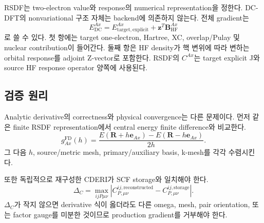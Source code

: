 RSDF는 two-electron value와 response의 numerical representation을 정한다. DC-DFT의
nonvariational 구조 자체는 backend에 의존하지 않는다. 전체 gradient는
\begin{equation}
 E_{\mathrm{DC}}^{Ax}
 =E_{\mathrm{target,explicit}}^{Ax}
 +\mathbf z^T\mathbf B_{\mathrm{HF}}^{Ax}
 \label{eq:dc-rsdf-total}
\end{equation}
로 쓸 수 있다. 첫 항에는 target one-electron, Hartree, XC, overlap/Pulay 및 nuclear
contribution이 들어간다. 둘째 항은 HF density가 핵 변위에 따라 변하는 orbital
response를 adjoint Z-vector로 포함한다. RSDF의 $C^{Ax}$는 target explicit J와 source
HF response operator 양쪽에 사용된다.

\subsection{검증 원리}

Analytic derivative의 correctness와 physical convergence는 다른 문제이다. 먼저 같은
finite RSDF representation에서 central energy finite difference와 비교한다.
\begin{equation}
 g_{Ax}^{\mathrm{FD}}(h)
 =\frac{E(\mathbf R+h\mathbf e_{Ax})
       -E(\mathbf R-h\mathbf e_{Ax})}{2h}.
\end{equation}
그 다음 $h$, source/metric mesh, primary/auxiliary basis, k-mesh를 각각 수렴시킨다.

또한 독립적으로 재구성한 CDERI가 SCF storage와 일치해야 한다.
\begin{equation}
 \Delta_C=\max_{ijP\mu\nu}
 \left|C_{P,\mu\nu}^{ij,\mathrm{reconstructed}}
 -C_{P,\mu\nu}^{ij,\mathrm{storage}}\right|.
\end{equation}
$\Delta_C$가 작지 않으면 derivative 식이 옳더라도 다른 omega, mesh, pair orientation,
또는 factor gauge를 미분한 것이므로 production gradient를 거부해야 한다.
